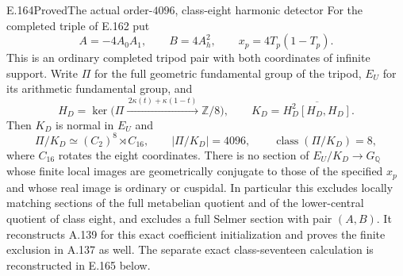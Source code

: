\begin{result}{E.164}{Proved}{The actual order-$4096$, class-eight harmonic detector}
For the completed triple of E.162 put
\[
 A=-4A_0A_1,\qquad B=4A_h^2,\qquad x_p=4T_p(1-T_p).
\tag{E.164.1}
\]
This is an ordinary completed tripod pair with both
coordinates of infinite support.  Write $\Pi$ for the full
geometric fundamental group of the tripod, $E_U$ for its
arithmetic fundamental group, and
\[
 H_D=\ker\bigl(\Pi\xrightarrow{\,2\kappa(t)+\kappa(1-t)\,}
                         \mathbb Z/8\bigr),\qquad
 K_D=\overline{H_D^2[H_D,H_D]}.
\]
Then $K_D$ is normal in $E_U$ and
\[
 \Pi/K_D\simeq(C_2)^8\rtimes C_{16},\qquad
 |\Pi/K_D|=4096,\qquad \operatorname{class}(\Pi/K_D)=8,
\tag{E.164.2}
\]
where $C_{16}$ rotates the eight coordinates.  There is no
section of $E_U/K_D\to G_{\mathbb Q}$ whose finite local
images are geometrically conjugate to those of the specified
$x_p$ and whose real image is ordinary or cuspidal.
In particular this excludes locally matching sections of
the full metabelian quotient and of the lower-central
quotient of class eight, and excludes a full Selmer section
with pair $(A,B)$.  It reconstructs A.139 for this exact
coefficient initialization and proves the finite exclusion
in A.137 as well.  The separate exact class-seventeen
calculation is reconstructed in E.165 below.
\end{result}
